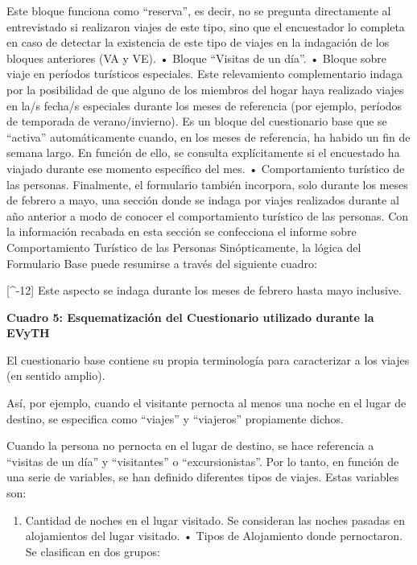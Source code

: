 \documentclass[
  openany]{book}
\providecommand{\tightlist}{%
  \setlength{\itemsep}{0pt}\setlength{\parskip}{0pt}}
\begin{document}
Este bloque funciona como ``reserva'', es decir, no se pregunta directamente al entrevistado si realizaron viajes de este tipo, sino que el encuestador lo completa en caso de detectar la existencia de este tipo de viajes en la indagación de los bloques anteriores (VA y VE).
• Bloque ``Visitas de un día''.
• Bloque sobre viaje en períodos turísticos especiales.
Este relevamiento complementario indaga por la posibilidad de que alguno de los miembros del hogar haya realizado viajes en la/s fecha/s especiales durante los meses de referencia (por ejemplo, períodos de temporada de verano/invierno).
Es un bloque del cuestionario base que se ``activa'' automáticamente cuando, en los meses de referencia, ha habido un fin de semana largo.
En función de ello, se consulta explícitamente si el encuestado ha viajado durante ese momento específico del mes.
• Comportamiento turístico de las personas.
Finalmente, el formulario también incorpora, solo durante los meses de febrero a mayo, una sección donde se indaga por viajes realizados durante al año anterior a modo de conocer el comportamiento turístico de las personas.
Con la información recabada en esta sección se confecciona el informe sobre Comportamiento Turístico de las Personas Sinópticamente, la lógica del Formulario Base puede resumirse a través del siguiente cuadro:

{[}\^{}-12{]} Este aspecto se indaga durante los meses de febrero hasta mayo inclusive.

\textbf{Cuadro 5: Esquematización del Cuestionario utilizado durante la EVyTH}

El cuestionario base contiene su propia terminología para caracterizar a los viajes (en sentido amplio).

Así, por ejemplo, cuando el visitante pernocta al menos una noche en el lugar de destino, se especifica como ``viajes'' y ``viajeros'' propiamente dichos.

Cuando la persona no pernocta en el lugar de destino, se hace referencia a ``visitas de un día'' y ``visitantes'' o ``excursionistas''.
Por lo tanto, en función de una serie de variables, se han definido diferentes tipos de viajes.
Estas variables son:

\begin{enumerate}
\def\labelenumi{\arabic{enumi}.}
\tightlist
\item
  Cantidad de noches en el lugar visitado. Se consideran las noches pasadas en alojamientos del lugar visitado. • Tipos de Alojamiento donde pernoctaron. Se clasifican en dos grupos:
\end{enumerate}
\end{document}

